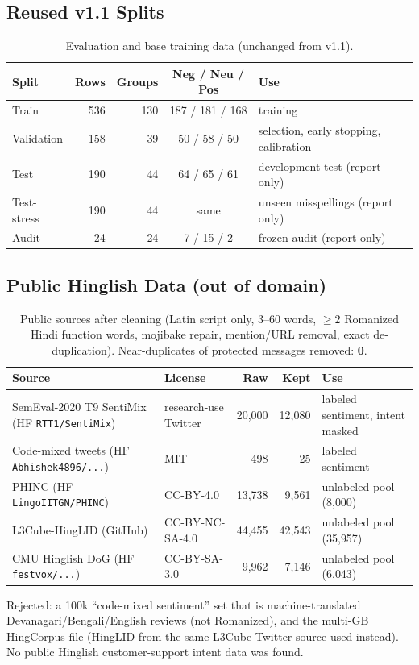 \documentclass[11pt,a4paper]{article}
\theoremstyle{remark}
\begin{document}
\subsection{Reused v1.1 Splits}
\begin{table}[h]
\centering\small
\caption{Evaluation and base training data (unchanged from v1.1).}
\label{tab:splits}
\begin{tabular}{@{}lrrcl@{}}
\toprule
Split & Rows & Groups & Neg / Neu / Pos & Use \\
\midrule
Train       & 536 & 130 & 187 / 181 / 168 & training \\
Validation  & 158 &  39 & \phantom{0}50 / \phantom{0}58 / \phantom{0}50 & selection, early stopping, calibration \\
Test        & 190 &  44 & \phantom{0}64 / \phantom{0}65 / \phantom{0}61 & development test (report only) \\
Test-stress & 190 &  44 & same & unseen misspellings (report only) \\
Audit       &  24 &  24 & \phantom{00}7 / \phantom{0}15 / \phantom{00}2 & frozen audit (report only) \\
\bottomrule
\end{tabular}
\end{table}

\subsection{Public Hinglish Data (out of domain)}
\begin{table}[h]
\centering\small
\caption{Public sources after cleaning (Latin script only, 3--60 words, $\ge2$ Romanized Hindi function words, mojibake repair, mention/URL removal, exact de-duplication). Near-duplicates of protected messages removed: \textbf{0}.}
\label{tab:public}
\begin{tabularx}{\linewidth}{@{}l l r r X@{}}
\toprule
Source & License & Raw & Kept & Use \\
\midrule
SemEval-2020 T9 SentiMix (HF \texttt{RTT1/SentiMix}) & research-use Twitter & 20{,}000 & 12{,}080 & labeled sentiment, intent masked \\
Code-mixed tweets (HF \texttt{Abhishek4896/...}) & MIT & 498 & 25 & labeled sentiment \\
PHINC (HF \texttt{LingoIITGN/PHINC}) & CC-BY-4.0 & 13{,}738 & 9{,}561 & unlabeled pool (8{,}000) \\
L3Cube-HingLID (GitHub) & CC-BY-NC-SA-4.0 & 44{,}455 & 42{,}543 & unlabeled pool (35{,}957) \\
CMU Hinglish DoG (HF \texttt{festvox/...}) & CC-BY-SA-3.0 & 9{,}962 & 7{,}146 & unlabeled pool (6{,}043) \\
\bottomrule
\end{tabularx}
\end{table}
Rejected: a 100k ``code-mixed sentiment'' set that is machine-translated Devanagari/Bengali/English reviews (not Romanized), and the multi-GB HingCorpus file (HingLID from the same L3Cube Twitter source used instead). No public Hinglish customer-support intent data was found.
\end{document}
